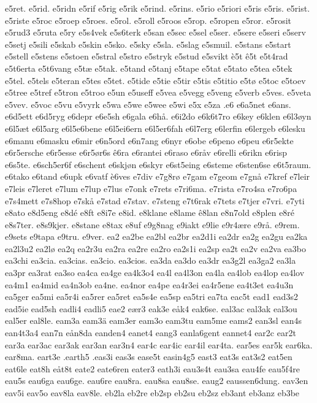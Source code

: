e5ret.
e5rid.
e5ridn
e5rif
e5rig
e5rik
e5rind.
e5rins.
e5rio
e5riori
e5ris
e5ris.
e5rist.
e5riste
e5roc
e5roep
e5roes.
e5rol.
e5roll
e5roos
e5rop.
e5ropen
e5ror.
e5rosit
e5rud3
e5ruta
e5ry
e5s4vek
e5s6terk
e5san
e5sec
e5sel
e5ser.
e5sere
e5seri
e5serv
e5setj
e5sili
e5skab
e5skin
e5sko.
e5sky
e5sla.
e5slag
e5smuil.
e5stans
e5start
e5stell
e5stens
e5stoen
e5stral
e5stro
e5stryk
e5stud
e5svikt
è5t
ê5t
e5t4rad
e5t6erta
e5t6vang
e5tæ
e5tak.
e5tand
e5tanj
e5tape
e5tat
e5tato
e5tea
e5tek
e5tel.
e5tels
e5teran
e5tes
e5tet.
e5tide
e5tie
e5tir
e5tis
e5titio
e5tø
e5toc
e5toev
e5tree
e5tref
e5tron
e5troo
e5un
e5useff
e5vea
e5vegg
e5veng
e5verb
e5ves.
e5veta
e5vev.
e5voc
e5vu
e5vyrk
e5wa
e5we
e5wee
e5wi
e5x
e5za
.e6
e6a5net
e6ans.
e6d5ett
e6d5ryg
e6depr
e6e5sh
e6gala
e6hå.
e6i2do
e6k6t7ro
e6key
e6klen
e6l3øyn
e6l5æt
e6l5arg
e6l5e6bene
e6l5ei6ern
e6l5er6fah
e6l7erg
e6lerfin
e6lergeb
e6lesku
e6manu
e6masku
e6mir
e6n5ord
e6n7ang
e6nyr
e6obe
e6peno
e6peu
e6r5ekte
e6r5ersche
e6r5esse
e6r5ør6s
ê6ra
e6rantei
e6raso
e6råv
e6relli
e6rikn
e6risp
e6s5te.
e6sch5er6f
e6schent
e6skjøn
e6skyr
e6st5eing
e6steme
e6sten6se
e6t5raum.
e6tako
e6tand
e6upk
e6vatf
è6ves
e7div
e7g8rø
e7gam
e7geom
e7gnå
e7kref
e7leir
e7leis
e7leret
e7lum
e7lup
e7lus
e7onk
e7rets
e7ri6ma.
e7rista
e7ro4sa
e7ro6pa
e7s4mett
e7s8hop
e7skå
e7stad
e7stav.
e7steng
e7t6rak
e7tets
e7tjer
e7vri.
e7yti
e8ato
e8d5eng
e8dé
e8ft
e8i7e
e8id.
e8klane
e8lame
ê8lan
e8n7old
e8plen
e8ré
e8s7ter.
e8s9kjer.
e8stane
e8tax
e8uf
e9g8nag
e9iakt
e9lie
e9r4ære
e9rå.
e9rem.
e9sets
e9tapa
e9tru.
e9ver.
ea2
ea2be
ea2bl
ea2br
ea2d1i
ea2dr
ea2g
ea2gu
ea2ka
ea2l3u2
ea2lø
ea2q
ea2r3u
ea2ra
ea2re
ea2ro
ea2s1i
ea2sp
ea2t
ea2v
ea2va
ea3bo
ea3chi
ea3cia.
ea3cias.
ea3cio.
ea3cios.
ea3da
ea3do
ea3dr
ea3g2l
ea3ga2
ea3la
ea3pr
ea3rat
ea3so
ea4ca
ea4ge
ea4k3o4
ea4l
ea4l3on
ea4la
ea4lob
ea4lop
ea4lov
ea4m1
ea4mid
ea4n3ob
ea4ne.
ea4nor
ea4pe
ea4r3ei
ea4r5ene
ea4t3et
ea4u3n
ea5ger
ea5mi
ea5r4i
ea5rer
ea5ret
ea5s4e
ea5sp
ea5tri
ea7ta
eac5t
ead1
ead3s2
ead5ie
ead5sh
eadli4
eadli5
eae2
eær3
eak3e
eåk4
eak6se.
eal3ac
eal3ak
eal3ou
eal5er
eal8le.
eam3a
eam3ä
eam3er
eam3o
eam3tu
eam5me
eams2
ean3sl
ean4s
ean4t3a4
ean7n
eån8da
eanden4
eanet4
eang3
eanla6gent
eannet4
ear2c
ear2t
ear3a
ear3ac
ear3ak
ear3an
ear3n4
ear4c
ear4ic
ear4il
ear4ta.
ear5es
ear5k
ear6ka.
ear8ma.
eart3e
.earth5
.eas3i
eas3s
ease5t
easin4g5
east3
eat3s
eat3s2
eat5en
eat6le
eat8h
eåt8t
eate2
eate6ren
eater3
eath3i
eau3s4t
eau3sa
eau4fe
eau5f4re
eau5s
eau6ga
eau6ge.
eau6re
eau8ra.
eau8sa
eau8se.
eaug2
eaussen6dung.
eav3en
eav5i
eav5o
eav8la
eav8le.
eb2la
eb2re
eb2sp
eb2su
eb2sz
eb3ant
eb3anz
eb3be
